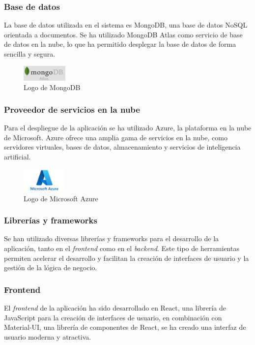 \subsubsection{Base de datos}
La base de datos utilizada en el sistema es MongoDB\cite{mongodb}, una base de datos NoSQL orientada a documentos.
Se ha utilizado MongoDB Atlas como servicio de base de datos en la nube, lo que ha permitido desplegar la base de datos de forma sencilla y segura.

\begin{figure}[H]
    \centering
    \includegraphics[width=0.2\textwidth]{figures/7-Construccion/mongodb.png}
    \caption{Logo de MongoDB}
\end{figure}


\subsubsection{Proveedor de servicios en la nube}
Para el despliegue de la aplicación se ha utilizado Azure\cite{azure}, la plataforma en la nube de Microsoft.
Azure ofrece una amplia gama de servicios en la nube, como servidores virtuales, bases de datos, almacenamiento y servicios de inteligencia artificial.

\begin{figure}[H]
    \centering
    \includegraphics[width=0.2\textwidth]{figures/7-Construccion/MicrosoftAzure.png}
    \caption{Logo de Microsoft Azure}
\end{figure}


\subsubsection{Librerías y frameworks}
Se han utilizado diversas librerías y frameworks para el desarrollo de la aplicación, tanto en el \textit{frontend} como en el \textit{backend}.
Este tipo de herramientas permiten acelerar el desarrollo y facilitan la creación de interfaces de usuario y la gestión de la lógica de negocio.
\subsubsection{Frontend}
El \textit{frontend} de la aplicación ha sido desarrollado en React\cite{react}, una librería de JavaScript para la creación de interfaces de usuario,
en combinación con Material-UI\cite{materialui}, una librería de componentes de React, se ha creado una interfaz de usuario moderna y atractiva.

